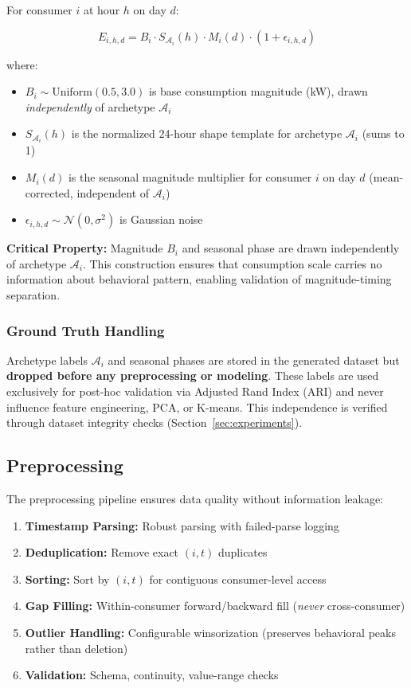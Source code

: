 For consumer $i$ at hour $h$ on day $d$:

\begin{equation}
E_{i,h,d} = B_i \cdot S_{\mathcal{A}_i}(h) \cdot M_i(d) \cdot (1 + \epsilon_{i,h,d})
\end{equation}

where:
\begin{itemize}
    \item $B_i \sim \text{Uniform}(0.5, 3.0)$ is base consumption magnitude (kW), drawn \emph{independently} of archetype $\mathcal{A}_i$
    \item $S_{\mathcal{A}_i}(h)$ is the normalized 24-hour shape template for archetype $\mathcal{A}_i$ (sums to 1)
    \item $M_i(d)$ is the seasonal magnitude multiplier for consumer $i$ on day $d$ (mean-corrected, independent of $\mathcal{A}_i$)
    \item $\epsilon_{i,h,d} \sim \mathcal{N}(0, \sigma^2)$ is Gaussian noise
\end{itemize}

\textbf{Critical Property:} Magnitude $B_i$ and seasonal phase are drawn independently of archetype $\mathcal{A}_i$. This construction ensures that consumption scale carries no information about behavioral pattern, enabling validation of magnitude-timing separation.

\subsubsection{Ground Truth Handling}

Archetype labels $\mathcal{A}_i$ and seasonal phases are stored in the generated dataset but \textbf{dropped before any preprocessing or modeling}. These labels are used exclusively for post-hoc validation via Adjusted Rand Index (ARI) and never influence feature engineering, PCA, or K-means. This independence is verified through dataset integrity checks (Section~\ref{sec:experiments}).

\subsection{Preprocessing}
\label{sec:preprocessing}

The preprocessing pipeline ensures data quality without information leakage:

\begin{enumerate}
    \item \textbf{Timestamp Parsing:} Robust parsing with failed-parse logging
    \item \textbf{Deduplication:} Remove exact $(i, t)$ duplicates
    \item \textbf{Sorting:} Sort by $(i, t)$ for contiguous consumer-level access
    \item \textbf{Gap Filling:} Within-consumer forward/backward fill (\emph{never} cross-consumer)
    \item \textbf{Outlier Handling:} Configurable winsorization (preserves behavioral peaks rather than deletion)
    \item \textbf{Validation:} Schema, continuity, value-range checks
\end{enumerate}


